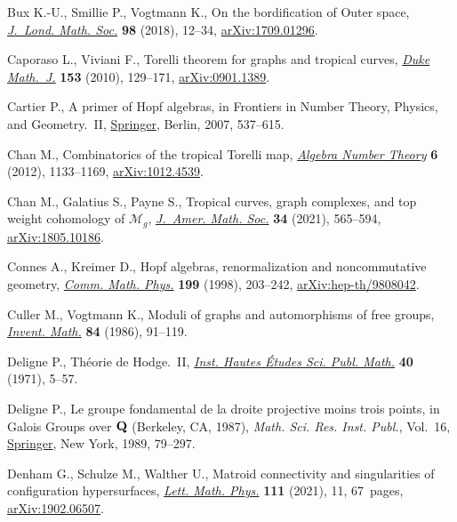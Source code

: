 \documentclass[pdftex]{sigma}%
\numberwithin{equation}{section}
\newcommand{\0}{\color{blue}{\mathsf{0}}}
\begin{document}
\begin{thebibliography}{99}
Bux K.-U., Smillie P., Vogtmann K., On the bordification of Outer space,
 \href{https://doi.org/10.1112/jlms.12124}{\textit{J.~Lond. Math. Soc.}} \textbf{98} (2018), 12--34, \href{https://arxiv.org/abs/1709.01296}{arXiv:1709.01296}.

Caporaso L., Viviani F., Torelli theorem for graphs and tropical curves,
 \href{https://doi.org/10.1215/00127094-2010-022}{\textit{Duke Math.~J.}} \textbf{153} (2010), 129--171, \href{https://arxiv.org/abs/0901.1389}{arXiv:0901.1389}.

Cartier P., A primer of {H}opf algebras, in Frontiers in Number Theory,
 Physics, and Geometry.~{II}, \href{https://doi.org/10.1007/978-3-540-30308-4_12}{Springer}, Berlin, 2007, 537--615.

Chan M., Combinatorics of the tropical {T}orelli map, \href{https://doi.org/10.2140/ant.2012.6.1133}{\textit{Algebra Number
 Theory}} \textbf{6} (2012), 1133--1169, \href{https://arxiv.org/abs/1012.4539}{arXiv:1012.4539}.

Chan M., Galatius S., Payne S., Tropical curves, graph complexes, and top
 weight cohomology of {$\mathcal{M}_g$}, \href{https://doi.org/10.1090/jams/965}{\textit{J.~Amer. Math. Soc.}}
 \textbf{34} (2021), 565--594, \href{https://arxiv.org/abs/1805.10186}{arXiv:1805.10186}.

Connes A., Kreimer D., Hopf algebras, renormalization and noncommutative
 geometry, \href{https://doi.org/10.1007/s002200050499}{\textit{Comm. Math. Phys.}} \textbf{199} (1998), 203--242,
 \href{https://arxiv.org/abs/hep-th/9808042}{arXiv:hep-th/9808042}.

Culler M., Vogtmann K., Moduli of graphs and automorphisms of free groups,
 \href{https://doi.org/10.1007/BF01388734}{\textit{Invent. Math.}} \textbf{84} (1986), 91--119.

Deligne P., Th\'eorie de {H}odge.~{II}, \href{https://doi.org/10.1007/BF02684692}{\textit{Inst. Hautes \'Etudes Sci.
 Publ. Math.}} \textbf{40} (1971), 5--57.

Deligne P., Le groupe fondamental de la droite projective moins trois points,
 in Galois Groups over {${\bf Q}$} ({B}erkeley, {CA}, 1987), \textit{Math.
 Sci. Res. Inst. Publ.}, Vol.~16, \href{https://doi.org/10.1007/978-1-4613-9649-9_3}{Springer}, New York, 1989, 79--297.

Denham G., Schulze M., Walther U., Matroid connectivity and singularities of
 configuration hypersurfaces, \href{https://doi.org/10.1007/s11005-020-01352-3}{\textit{Lett. Math. Phys.}} \textbf{111} (2021),
 11, 67~pages, \href{https://arxiv.org/abs/1902.06507}{arXiv:1902.06507}.


\end{thebibliography}
\end{document}
